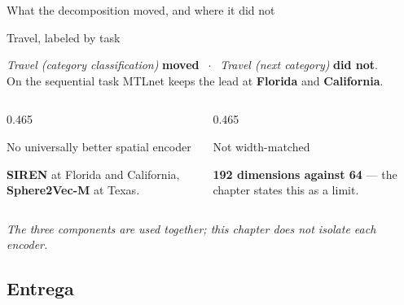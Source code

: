 \documentclass{beamer}
\begin{document}
\begin{frame}{What the decomposition moved, and where it did not}
    \begin{block}{Travel, labeled by task}
        {\small
        \textit{Travel (category classification)} \textcolor{primary}{\textbf{moved}}
        $\;\cdot\;$ \textit{Travel (next category)} \textcolor{alert}{\textbf{did not}}.\\
        On the sequential task MTLnet keeps the lead at \textbf{Florida} and \textbf{California}.\par}
    \end{block}

    \medskip
    \begin{columns}[t,onlytextwidth]
        \begin{column}{0.465\textwidth}
            \begin{block}{No universally better spatial encoder}
                {\small \textbf{SIREN} at Florida and California, \textbf{Sphere2Vec-M} at Texas.\par}
            \end{block}
        \end{column}
        \hfill
        \begin{column}{0.465\textwidth}
            \begin{alertblock}{Not width-matched}
                {\small \textbf{192 dimensions against 64} --- the chapter states this as a limit.\par}
            \end{alertblock}
        \end{column}
    \end{columns}

    \vfill
    {\footnotesize\itshape The three components are used together; this chapter does not isolate
    each encoder.\par}
\end{frame}

\subsection{Entrega}
\end{document}
